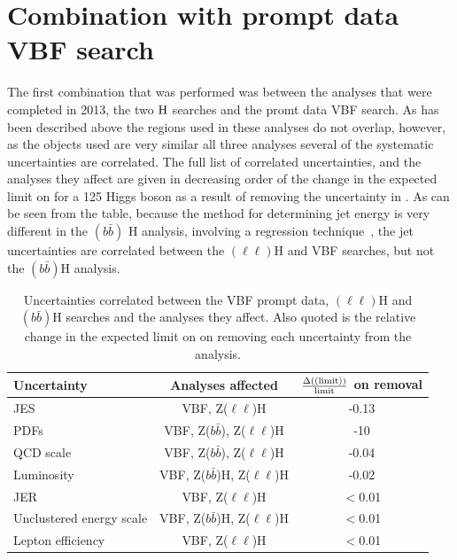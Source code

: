 \section{Combination with prompt data VBF search}
\label{sec:combprompt}
The first combination that was performed was between the analyses that were completed in 2013, the two \PZ$\rm{H}$ searches and the promt data \ac{VBF} search. As has been described above the regions used in these analyses do not overlap, however, as the objects used are very similar all three analyses several of the systematic uncertainties are correlated. The full list of correlated uncertainties, and the analyses they affect are given in decreasing order of the change in the expected limit on \BRinv for a 125 \GeV Higgs boson as a result of removing the uncertainty in . As can be seen from the table, because the method for determining jet energy is very different in the \PZ$(b\bar{b})$ H analysis, involving a regression technique~\cite{CMS-PAS-HIG-13-028}, the jet uncertainties are correlated between the \PZ$(\ell\ell)$H and \ac{VBF} searches, but not the \PZ$(b\bar{b})$H analysis.

\begin{table}
  \caption{Uncertainties correlated between the \ac{VBF} prompt data, \PZ$(\ell\ell)$H and \PZ$(b\bar{b})$H searches and the analyses they affect. Also quoted is the relative change in the expected limit on \BRinv on removing each uncertainty from the analysis.}
  \label{tab:promptcorrs}
  \begin{tabular}{lcc}
    \hline
    \hline
    Uncertainty & Analyses affected & $\frac{\Delta(\rm(limit))}{\rm{limit}}$ on removal \\
    \hline
    \ac{JES} & VBF, Z($\ell\ell$)H & -0.13 \\
    PDFs & VBF, Z($b\bar{b}$), Z($\ell\ell$)H & -10 \\
    QCD scale & VBF, Z($b\bar{b}$), Z($\ell\ell$)H & -0.04\\
    Luminosity & VBF, Z($b\bar{b}$)H, Z($\ell\ell$)H & -0.02\\
    \ac{JER} & VBF, Z($\ell\ell$)H & $<$0.01\\
    Unclustered energy scale & VBF, Z($b\bar{b}$)H, Z($\ell\ell$)H & $<$0.01\\
    Lepton efficiency & VBF, Z($\ell\ell$)H & $<$0.01\\
    \hline
    \hline
  \end{tabular}
\end{table}

